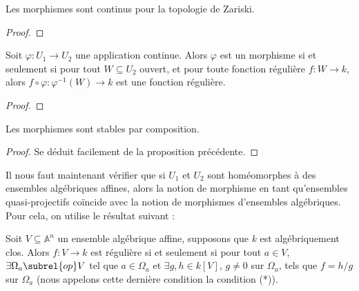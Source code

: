             \begin{prop}
                Les morphismes sont continus pour la topologie de Zariski.
            \end{prop}
            \begin{proof}
            \end{proof}
            \begin{prop}
                Soit $\varphi : U_1 \to U_2$ une application continue. Alors $\varphi$ est un morphisme si et seulement si pour tout $W \subseteq U_2$ ouvert, et pour toute fonction régulière $f : W \to k$, alors $f \circ \varphi : \varphi^{-1}(W) \to k$ est une fonction régulière.
            \end{prop}
            \begin{proof}
            \end{proof}
            \begin{prop}
                Les morphismes sont stables par composition.
            \end{prop}
            \begin{proof}
                Se déduit facilement de la proposition précédente.
            \end{proof}
            Il nous faut maintenant vérifier que si $U_1$ et $U_2$ sont homéomorphes à des ensembles algébriques affines, alors la notion de morphisme en tant qu'ensembles quasi-projectifs coïncide avec la notion de morphismes d'ensembles algébriques. Pour cela, on utilise le résultat suivant :
            \begin{prop}
                Soit $V \subseteq \mathbb{A}^n$ un ensemble algébrique affine, supposons que $k$ est algébriquement clos. Alors $f : V \to k$ est régulière si et seulement si pour tout $a \in V$, $\exists \Omega_a \subrel{op} V$ tel que $a \in \Omega_a$ et $\exists g,h \in k[V]$, $g \neq 0$ sur $\Omega_a$, tels que $f = h/g$ sur $\Omega_a$ (nous appelons cette dernière condition la condition (*)).
            \end{prop}
